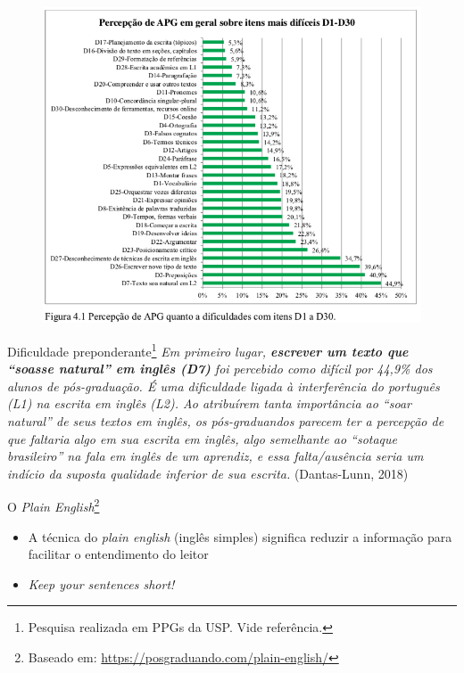 \begin{frame}
\begin{figure}
\centering
\includegraphics[scale=0.4]{figs/05/dificuldades-apg2}
\end{figure}
\end{frame}

\begin{frame}
\begin{block}{Dificuldade preponderante\footnote{Pesquisa realizada em PPGs da USP. Vide referência.}}
\small{\emph{Em primeiro lugar, \textbf{escrever um texto que ``soasse natural'' em inglês (D7)} foi percebido como difícil por 44,9\% dos alunos de pós-graduação. É uma dificuldade ligada à interferência do português (L1) na escrita em inglês (L2). Ao atribuírem tanta importância ao ``soar natural'' de seus textos em inglês, os pós-graduandos parecem ter a percepção de que faltaria algo em sua escrita em inglês, algo semelhante ao ``sotaque brasileiro'' na fala em inglês de um aprendiz, e essa falta/ausência seria um indício da suposta qualidade inferior de sua escrita.} (Dantas-Lunn, 2018)}
\end{block}
\end{frame}

\begin{frame}{O \emph{Plain English}\footnote{Baseado em: \url{https://posgraduando.com/plain-english/}}}
\begin{itemize}
\item A técnica do \emph{plain english} (inglês simples) significa reduzir a informação para facilitar o entendimento do leitor
\item \textit{Keep your sentences short!}
\end{itemize}
\end{frame}

